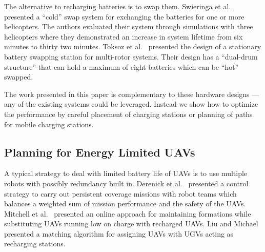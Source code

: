 \documentclass[letterpaper,10pt,conference]{ieeeconf}
\begin{document}
The alternative to recharging batteries is to swap them. Swieringa et al.~\cite{swieringa2010autonomous} presented a ``cold'' swap system for exchanging the batteries for one or more helicopters. The authors evaluated their system through simulations with three helicopters where they demonstrated an increase in system lifetime from six minutes to thirty two minutes. %
Toksoz et al.~\cite{toksoz2011automated} presented the design of a stationary battery swapping station for multi-rotor systems. Their design has a ``dual-drum structure'' that can hold a maximum of eight batteries which can be ``hot'' swapped. 

The work presented in this paper is complementary to these hardware designs --- any of the existing systems could be leveraged. Instead we show how to optimize the performance by careful placement of charging stations or planning of paths for mobile charging stations.


\subsection{Planning for Energy Limited UAVs} \label{sec:planningEnergy}
A typical strategy to deal with limited battery life of UAVs is to use multiple robots with possibly redundancy built in. Derenick et al.~\cite{derenick2011energy} presented a control strategy to carry out persistent coverage missions with robot teams which balances a weighted sum of mission performance and the safety of the UAVs. %
Mitchell et al.~\cite{mitchell2016persistent} presented an online approach for maintaining formations while  substituting UAVs running low on charge with recharged UAVs. Liu and Michael~\cite{liu2014energy} presented a matching algorithm for assigning UAVs with UGVs acting as recharging stations. %
\end{document}
